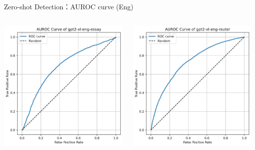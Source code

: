 \documentclass[serif]{beamer}
\begin{document}
\begin{frame}{Zero-shot Detection：AUROC curve (Eng)}
\begin{columns}[t]
    \centering
    \includegraphics[width=\linewidth]{images/gpt2-xl-eng-essay.png}

    \centering
    \includegraphics[width=\linewidth]{images/gpt2-xl-eng-reuter.png}


\end{columns}
\end{frame}
\end{document}
